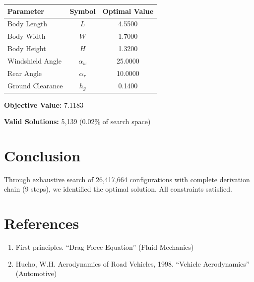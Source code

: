\documentclass[11pt,a4paper]{article}
\begin{document}
\begin{center}
\begin{tabular}{lcc}
\hline
Parameter & Symbol & Optimal Value \\
\hline
Body Length & $L$ & 4.5500 \\
Body Width & $W$ & 1.7000 \\
Body Height & $H$ & 1.3200 \\
Windshield Angle & $α_w$ & 25.0000 \\
Rear Angle & $α_r$ & 10.0000 \\
Ground Clearance & $h_g$ & 0.1400 \\
\hline
\end{tabular}
\end{center}

\textbf{Objective Value:} 7.1183

\textbf{Valid Solutions:} 5,139 (0.02\% of search space)

\section{Conclusion}

Through exhaustive search of 26,417,664 configurations with complete derivation chain (9 steps), we identified the optimal solution. All constraints satisfied.

\section*{References}

\begin{enumerate}
\item First principles. ``Drag Force Equation'' (Fluid Mechanics)
\item Hucho, W.H. Aerodynamics of Road Vehicles, 1998. ``Vehicle Aerodynamics'' (Automotive)
\end{enumerate}
\end{document}
